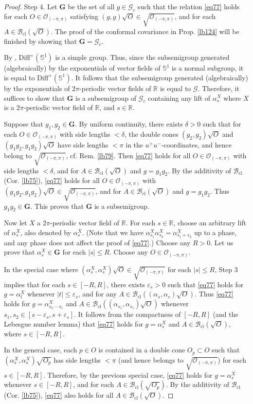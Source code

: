 \documentclass[11pt,b5paper,notitlepage]{article}
\theoremstyle{definition}
\theoremstyle{plain}
\newcommand{\DiffS}{\mathrm{Diff}^+(\mathbb S^1)}
\newcommand{\mbf}{\mathbf}
\newcommand{\Rbb}{\mathbb R}
\newcommand{\Sbb}{{\mathbb S}}
\newcommand{\Gc}{\mathscr G_c}
\newcommand{\eps}{\varepsilon}
\newcommand{\SG}{\mathscr G}
\newcommand{\Bcl}{\mathcal B_{\mathrm{cl}}}
\newcommand{\Opp}{\mathcal O_{(-\pi,\pi)}}
\newcommand{\ZOpp}{\sqrt{\mathcal O_{(-\pi,\pi)}}}
\numberwithin{equation}{section}
\begin{document}
\begin{proof}
Step 4. Let $\mbf G$ be the set of all $g\in\Gc$ such that the relation \eqref{eq77} holds for each $O\in\Opp$ satisfying $(g,g)\sqrt O\in\ZOpp$, and for each $A\in\Bcl(\sqrt O)$. The proof of the conformal covariance in Prop. \ref{lb124} will be finished by showing that $\mbf G=\Gc$.

By \cite{Eps70,Her71,Thu74}, $\DiffS$ is a simple group. Thus, since the subsemigroup generated (algebraically) by the exponentials of vector fields of $\Sbb^1$ is a normal subgroup, it is equal to $\DiffS$. It follows that the subsemigroup generated (algebraically) by the exponentials of $2\pi$-periodic vector fields of $\Rbb$ is equal to $\SG$. Therefore, it suffices to show that $\mbf G$ is a subsemigroup of $\Gc$ containing any lift of $\alpha^X_s$ where $X$ is a $2\pi$-periodic vector field of $\Rbb$, and $s\in\Rbb$.


Suppose that $g_1,g_2\in\mbf G$. By uniform continuity, there exists $\delta>0$ such that for each $O\in\Opp$ with side lengths $<\delta$, the double cones $(g_2,g_2)\sqrt O$ and $(g_1g_2,g_1g_2)\sqrt O$ have side lengths $<\pi$ in the $u^+u^-$-coordinates, and hence belong to $\ZOpp$, cf. Rem. \ref{lb79}. Then \eqref{eq77} holds for all $O\in\Opp$ with side lengths $<\delta$, and for $A\in\Bcl(\sqrt O)$ and $g=g_1g_2$. By the additivity of $\Bcl$ (Cor. \ref{lb75}), \eqref{eq77} holds for all $O\in\Opp$ with $(g_1g_2,g_1g_2)\sqrt O\in\ZOpp$, and for $A\in\Bcl(\sqrt O)$ and $g=g_1g_2$. Thus $g_1g_2\in\mbf G$. This proves that $\mbf G$ is a subsemigroup.


Now let $X$ a $2\pi$-periodic vector field of $\Rbb$. For each $s\in\Rbb$, choose an arbitrary lift of $\alpha^X_s$, also denoted by $\alpha^X_s$. (Note that we have $\alpha_{s_1}^X\alpha_{s_2}^X=\alpha_{s_1+s_2}^X$ up to a phase, and any phase does not affect the proof of \eqref{eq77}.) Choose any $R>0$. Let us prove that $\alpha^X_s\in\mbf G$ for each $|s|\leq R$. Choose any $O\in\Opp$. 

In the special case where $(\alpha^X_s,\alpha^X_s)\sqrt O\in\ZOpp$ for each $|s|\leq R$, Step 3 implies that for each $s\in[-R,R]$, there exists $\eps_s>0$ such that \eqref{eq77} holds for $g=\alpha^X_t$ whenever $|t|\leq\eps_s$, and for any $A\in\Bcl((\alpha_s,\alpha_s)\sqrt O)$. Thus \eqref{eq77} holds for $g=\alpha^X_{s_2-s_1}$ and $A\in\Bcl((\alpha_{s_1},\alpha_{s_1})\sqrt O)$ whenever $s_1,s_2\in[s-\eps_s,s+\eps_s]$. It follows from the compactness of $[-R,R]$ (and the Lebesgue number lemma) that \eqref{eq77} holds for $g=\alpha^X_s$ and $A\in\Bcl(\sqrt O)$, where $s\in[-R,R]$.

In the general case, each $p\in O$ is contained in a double cone $O_p\subset O$ such that $(\alpha_s^X,\alpha^X_s)\sqrt{O_p}$ has side lengths $<\pi$ (and hence belongs to $\ZOpp$) for each $s\in[-R,R]$. Therefore, by the previous special case, \eqref{eq77} holds for $g=\alpha^X_s$ whenever $s\in[-R,R]$, and for each $A\in\Bcl(\sqrt{O_p})$. By the additivity of $\Bcl$ (Cor. \ref{lb75}), \eqref{eq77} also holds for all $A\in\Bcl(\sqrt O)$.
\end{proof}
\end{document}
